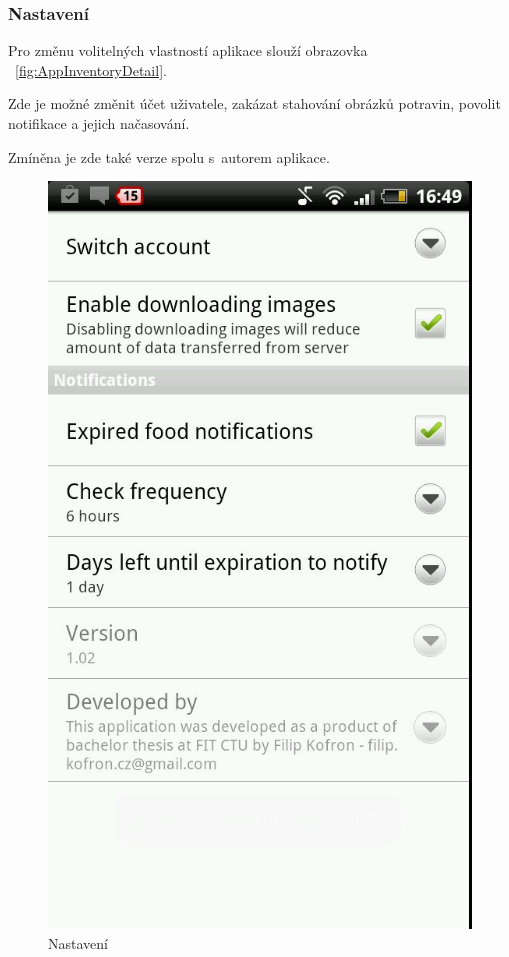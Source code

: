 \documentclass[thesis=B,czech]{FITthesis}[2013/10/20]
\begin{document}
\clearpage

\subsubsection{Nastavení}

Pro změnu volitelných vlastností aplikace slouží obrazovka ~\ref{fig:AppInventoryDetail}.

Zde je možné změnit účet uživatele, zakázat stahování obrázků potravin, povolit notifikace a jejich načasování.

Zmíněna je zde také verze spolu s~autorem aplikace.

\begin{figure}[H]
  \centering
  \includegraphics[scale=0.4]{screenshots/app_settings.jpg}
  \caption{Nastavení}
  \label{fig:AppSettings}
\end{figure}
\end{document}
